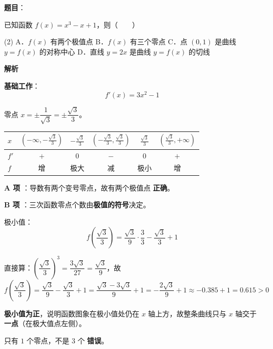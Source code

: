 \begin{answer}

\textbf{题目}：

已知函数 $f(x)=x^{3}-x+1$，则\mbox{（　　）}

\begin{gkopts}(2)
\task A．$f(x)$ 有两个极值点
\task B．$f(x)$ 有三个零点
\task C．点 $(0,1)$ 是曲线 $y=f(x)$ 的对称中心
\task D．直线 $y=2x$ 是曲线 $y=f(x)$ 的切线
\end{gkopts}

\textbf{解析}

\textbf{基础工作}：
\nopagebreak[4]
\[f'(x)=3x^{2}-1\]

零点 $x=\pm\dfrac1{\sqrt3}=\pm\dfrac{\sqrt3}3$。

\begin{center}
\begin{tabular}{lccccc}
\toprule
$x$ & $\left(-\infty,-\frac{\sqrt3}3\right)$ & $-\frac{\sqrt3}3$ & $\left(-\frac{\sqrt3}3,\frac{\sqrt3}3\right)$ & $\frac{\sqrt3}3$ & $\left(\frac{\sqrt3}3,+\infty\right)$ \\
\midrule
$f'$ & $+$ & $0$ & $-$ & $0$ & $+$ \\
$f$ & 增 & 极大 & 减 & 极小 & 增 \\
\bottomrule
\end{tabular}
\end{center}

\par\medskip

\textbf{A 项 }：导数有两个变号零点，故有两个极值点 \textbf{正确}。

\par\medskip

\textbf{B 项 }：三次函数零点个数由\textbf{极值的符号}决定。

极小值：
\nopagebreak[4]
\[f\left(\frac{\sqrt3}3\right)=\frac{\sqrt3}{9}\cdot\frac{3}{3}-\frac{\sqrt3}3+1\]

直接算：$\left(\dfrac{\sqrt3}3\right)^{3}=\dfrac{3\sqrt3}{27}=\dfrac{\sqrt3}9$，故
\nopagebreak[4]
\[f\left(\frac{\sqrt3}3\right)=\frac{\sqrt3}9-\frac{\sqrt3}3+1=\frac{\sqrt3-3\sqrt3}9+1=-\frac{2\sqrt3}9+1\approx-0.385+1=0.615>0\]

\textbf{极小值为正}，说明函数图象在极小值处仍在 $x$ 轴上方，故整条曲线只与 $x$ 轴交于\textbf{一点}（在极大值点左侧）。

只有 $1$ 个零点，不是 $3$ 个  \textbf{错误}。


\end{answer}
